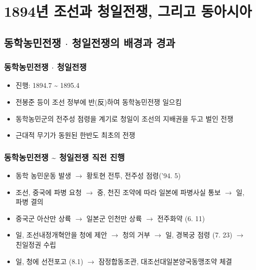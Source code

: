 \section{1894년 조선과 청일전쟁, 그리고 동아시아}

\subsection{동학농민전쟁 $\cdot$ 청일전쟁의 배경과 경과}

\subsubsection*{동학농민전쟁 $\cdot$ 청일전쟁}
\begin{itemize}
    \item 진행: 1894.7 \textasciitilde{} 1895.4
    \item 전봉준 등이 조선 정부에 반(反)하여 동학농민전쟁 일으킴
    \item 동학농민군의 전주성 점령을 계기로 청일이 조선의 지배권을 두고 벌인 전쟁
    \item 근대적 무기가 동원된 한반도 최초의 전쟁
\end{itemize}

\subsubsection*{동학농민전쟁 \textasciitilde{} 청일전쟁 직전 진행}
\begin{itemize}
    \item 동학 농민운동 발생 $\rightarrow$ 황토현 전투, 전주성 점령('94. 5)
    \item 조선, 중국에 파병 요청 $\rightarrow$ 중, 천진 조약에 따라 일본에 파병사실 통보 $\rightarrow$ 일, 파병 결의
    \item 중국군 아산만 상륙 $\rightarrow$ 일본군 인천만 상륙 $\rightarrow$ 전주화약 (6. 11)
    \item 일, 조선내정개혁안을 청에 제안 $\rightarrow$ 청의 거부 $\rightarrow$ 일, 경복궁 점령 (7. 23) $\rightarrow$ 친일정권 수립
    \item 일, 청에 선전포고 (8.1) $\rightarrow$ 잠정합동조관, 대조선대일본양국동맹조약 체결
\end{itemize}

